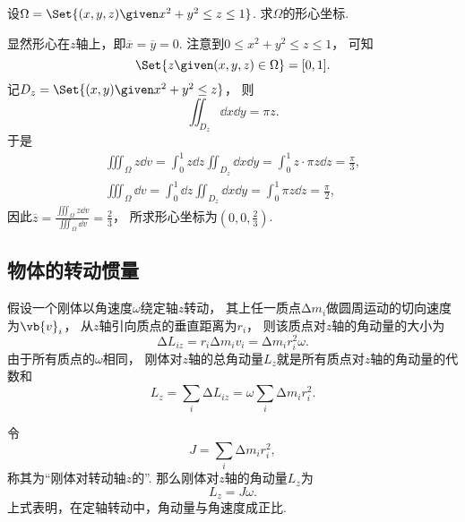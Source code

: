 \begin{example}
设\(\Omega = \Set{ (x,y,z) \given x^2+y^2 \leq z \leq 1 }\).
求\(\Omega\)的形心坐标.
\begin{solution}
显然形心在\(z\)轴上，即\(\overline{x} = \overline{y} = 0\).
注意到\(0 \leq x^2+y^2 \leq z \leq 1\)，
可知\begin{equation*}
	\Set{ z \given (x,y,z) \in \Omega } = [0,1].
\end{equation*}
记\(D_z = \Set{ (x,y) \given x^2+y^2 \leq z}\)，
则\begin{equation*}
	\iint_{D_z} \dd{x}\dd{y} = \pi z.
\end{equation*}
于是\begin{gather*}
	\iiint_\Omega z \dd{v}
	= \int_0^1 z \dd{z} \iint_{D_z} \dd{x}\dd{y}
	= \int_0^1 z \cdot \pi z \dd{z}
	= \frac\pi3, \\
	\iiint_\Omega \dd{v}
	= \int_0^1 \dd{z} \iint_{D_z} \dd{x} \dd{y}
	= \int_0^1 \pi z \dd{z}
	= \frac\pi2,
\end{gather*}
因此\(\overline{z}
= \frac{\iiint_\Omega z \dd{v}}{\iiint_\Omega \dd{v}}
= \frac23\)，
所求形心坐标为\(\left( 0,0,\frac23 \right)\).
\end{solution}
\end{example}

\subsection{物体的转动惯量}
假设一个刚体以角速度\(\omega\)绕定轴\(z\)转动，
其上任一质点\(\increment m_i\)做圆周运动的切向速度为\(\vb{v}_i\)，
从\(z\)轴引向质点的垂直距离为\(r_i\)，
则该质点对\(z\)轴的角动量的大小为\begin{equation*}
	\increment L_{iz}
	= r_i \increment m_i v_i
	= \increment m_i r_i^2 \omega.
\end{equation*}
由于所有质点的\(\omega\)相同，
刚体对\(z\)轴的总角动量\(L_z\)就是所有质点对\(z\)轴的角动量的代数和\begin{equation*}
	L_z = \sum_i \increment L_{iz}
	= \omega \sum_i \increment m_i r_i^2.
\end{equation*}

令\begin{equation*}
	J = \sum_i \increment m_i r_i^2,
\end{equation*}
称其为“刚体对转动轴\(z\)的”.
那么刚体对\(z\)轴的角动量\(L_z\)为\begin{equation*}
	L_z = J \omega.
\end{equation*}
上式表明，在定轴转动中，角动量与角速度成正比.

